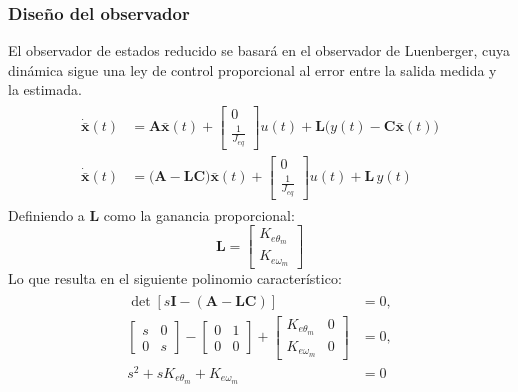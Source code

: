 \documentclass[12pt, a4paper,journal, onecolumn, compsoc]{IEEEtran}
\begin{document}
\subsubsection{Diseño del observador}
    El observador de estados reducido se basará en el observador de Luenberger, cuya dinámica sigue una ley de control proporcional al error entre la salida medida y la estimada.
    \begin{gather*}
    \begin{aligned}
    \dot{\bar{\bm{x}}}(t)&=
    \bm{A}\bar{\bm{x}}(t) +
    \begin{bmatrix}
    0 \\ \frac{1}{J_{eq}}
    \end{bmatrix}u(t)+
    \bm{L}\big(y(t)-\bm{C}\bar{\bm{x}}(t)\big)\\
    \dot{\bar{\bm{x}}}(t)&=
    \big(\bm{A}-\bm{L}\bm{C}\big)\bar{\bm{x}}(t) +
    \begin{bmatrix}
    0 \\ \frac{1}{J_{eq}}
    \end{bmatrix}u(t)+\bm{L}\,y(t)
    \end{aligned}
    \end{gather*}
    Definiendo a $\bm{L}$ como la ganancia proporcional:
    \begin{equation*}
        \bm{L}=
        \begin{bmatrix}
            K_{e\theta_m}\\
            K_{e\omega_m}
        \end{bmatrix}
    \end{equation*}
    Lo que resulta en el siguiente polinomio característico:
    \begin{gather*}
    \begin{aligned}
        \det\!\left[s\bm{I}-\left(\bm{A}-\bm{L}\bm{C}\right)\right]&=0,\\
        \begin{bmatrix}
            s & 0 \\ 
            0 & s
        \end{bmatrix}-
        \begin{bmatrix}
            0 & 1 \\
            0 & 0
        \end{bmatrix}+
        \begin{bmatrix}
            K_{e\theta_m} & 0 \\
            K_{e\omega_m} & 0
        \end{bmatrix} &=0,
        \\
        s^2 + s K_{e\theta_m}+K_{e\omega_m}&=0
    \end{aligned}
    \end{gather*}
\end{document}
